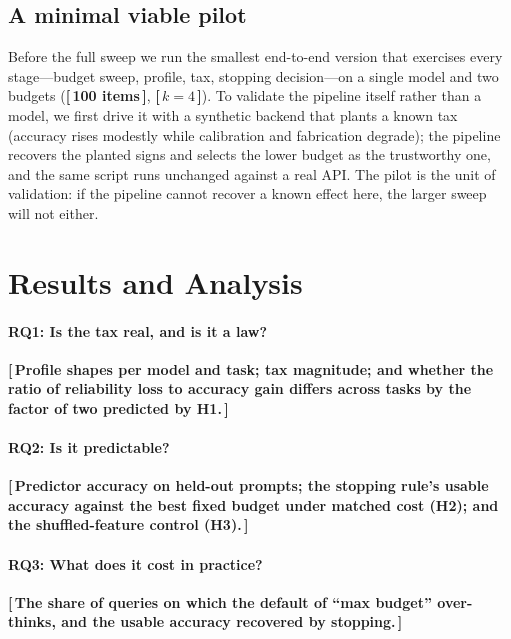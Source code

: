 \documentclass[11pt]{article}
\newcommand{\PH}[1]{\textbf{[\,#1\,]}}
\begin{document}
\subsection{A minimal viable pilot}
Before the full sweep we run the smallest end-to-end version that exercises
every stage---budget sweep, profile, tax, stopping decision---on a single
model and two budgets (\PH{100 items}, \PH{$k=4$}).
To validate the pipeline itself rather than a model, we first drive it with a
synthetic backend that plants a known tax (accuracy rises modestly while
calibration and fabrication degrade); the pipeline recovers the planted signs
and selects the lower budget as the trustworthy one, and the same script runs
unchanged against a real API.
The pilot is the unit of validation: if the pipeline cannot recover a known
effect here, the larger sweep will not either.

\section{Results and Analysis}
\paragraph{RQ1: Is the tax real, and is it a law?}
\PH{Profile shapes per model and task; tax magnitude; and whether the ratio of
reliability loss to accuracy gain differs across tasks by the factor of two
predicted by H1.}
\paragraph{RQ2: Is it predictable?}
\PH{Predictor accuracy on held-out prompts; the stopping rule's usable
accuracy against the best fixed budget under matched cost (H2); and the
shuffled-feature control (H3).}
\paragraph{RQ3: What does it cost in practice?}
\PH{The share of queries on which the default of ``max budget'' over-thinks,
and the usable accuracy recovered by stopping.}


\end{document}
